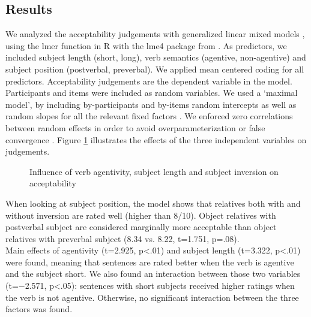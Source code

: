 \documentclass[output=paper]{langscibook}
\begin{document}
\subsection{Results}
We analyzed the acceptability judgements with generalized linear mixed models \citep{baayen2008mixed}, using the lmer function in R with the lme4 package from \citet{Bates2015}. As predictors, we included subject length (short, long), verb semantics (agentive, non-agentive) and subject position (postverbal, preverbal). We applied mean centered coding for all predictors. Acceptability judgements are the dependent variable in the model. Participants and items were included as random variables. We used a `maximal model’, by including by-participants and by-items random intercepts as well as random slopes for all the relevant fixed factors \citep{barr2013}. We enforced zero correlations between random effects in order to avoid overparameterization or false convergence \citep{Bates2015}.  Figure \ref{figure3judgementresults} illustrates the effects of the three independent variables on judgements. 


\begin{figure}
\caption{Influence of verb agentivity, subject length and subject
  inversion on acceptability}
\label{figure3judgementresults}
\end{figure}


When looking at subject position, the model shows that relatives both with and without inversion are rated well (higher than 8/10). Object relatives with postverbal subject are considered marginally more acceptable than object relatives with preverbal subject (8.34 vs. 8.22, t=1.751, p=.08).\\ 
Main effects of agentivity (t=2.925, p<.01) and subject length (t=3.322, p<.01) were found, meaning that sentences are rated better when the verb is agentive and the subject short. We also found an interaction between those two variables (t=$-$2.571, p<.05): sentences with short subjects received higher ratings when the verb is not agentive. Otherwise, no significant interaction between the three factors was found. 
\end{document}
